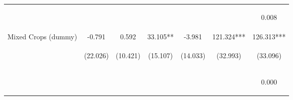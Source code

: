 \begin{center}
\begin{tabular}{lcccccc}
\vspace{4pt} & \begin{footnotesize}[0.027]\end{footnotesize} & \begin{footnotesize}[0.169]\end{footnotesize} & \begin{footnotesize}[0.136]\end{footnotesize} & \begin{footnotesize}[0.969]\end{footnotesize} & \begin{footnotesize}[0.015]\end{footnotesize} & \begin{footnotesize}0.008\end{footnotesize} \\
Mixed Crops (dummy) & -0.791 & 0.592 & 33.105** & -3.981 & 121.324*** & 126.313*** \\
 & \begin{footnotesize}(22.026)\end{footnotesize} & \begin{footnotesize}(10.421)\end{footnotesize} & \begin{footnotesize}(15.107)\end{footnotesize} & \begin{footnotesize}(14.033)\end{footnotesize} & \begin{footnotesize}(32.993)\end{footnotesize} & \begin{footnotesize}(33.096)\end{footnotesize} \\
\vspace{4pt} & \begin{footnotesize}[0.971]\end{footnotesize} & \begin{footnotesize}[0.955]\end{footnotesize} & \begin{footnotesize}[0.028]\end{footnotesize} & \begin{footnotesize}[0.777]\end{footnotesize} & \begin{footnotesize}[0.000]\end{footnotesize} & \begin{footnotesize}0.000\end{footnotesize} \\

\end{tabular}
\end{center}
